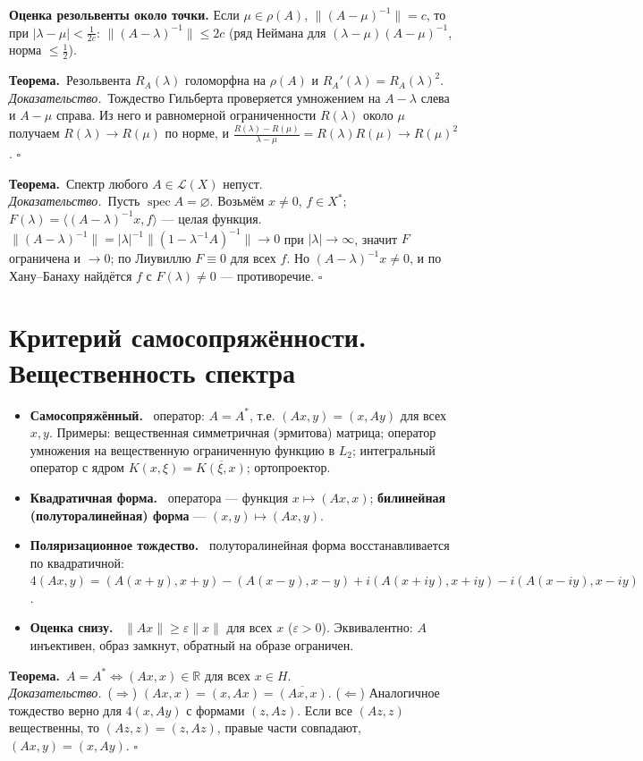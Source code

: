 \documentclass[11pt,a4paper]{article}
\newcommand{\Lc}{\mathcal L}
\newcommand{\RR}{\mathbb R}
\newcommand{\spec}{\operatorname{spec}}
\newcommand{\df}[1]{\textbf{#1.}~}
\newcommand{\thm}{\textbf{Теорема.}~}
\newcommand{\pf}{\textit{Доказательство.}~}
\newcommand{\qedd}{\hfill$\square$}
\begin{document}
\textbf{Оценка резольвенты около точки.} Если $\mu\in\rho(A)$, $\|(A-\mu)^{-1}\|=c$, то при $|\lambda-\mu|<\frac1{2c}$: $\|(A-\lambda)^{-1}\|\le2c$ (ряд Неймана для $(\lambda-\mu)(A-\mu)^{-1}$, норма $\le\frac12$).

\thm Резольвента $R_A(\lambda)$ голоморфна на $\rho(A)$ и $R_A'(\lambda)=R_A(\lambda)^2$.\\
\pf Тождество Гильберта проверяется умножением на $A-\lambda$ слева и $A-\mu$ справа. Из него и равномерной ограниченности $R(\lambda)$ около $\mu$ получаем $R(\lambda)\to R(\mu)$ по норме, и $\frac{R(\lambda)-R(\mu)}{\lambda-\mu}=R(\lambda)R(\mu)\to R(\mu)^2$. \qedd

\thm Спектр любого $A\in\Lc(X)$ непуст.\\
\pf Пусть $\spec A=\varnothing$. Возьмём $x\ne0$, $f\in X^*$; $F(\lambda)=\langle(A-\lambda)^{-1}x,f\rangle$ — целая функция. $\|(A-\lambda)^{-1}\|=|\lambda|^{-1}\|(1-\lambda^{-1}A)^{-1}\|\to0$ при $|\lambda|\to\infty$, значит $F$ ограничена и $\to0$; по Лиувиллю $F\equiv0$ для всех $f$. Но $(A-\lambda)^{-1}x\ne0$, и по Хану–Банаху найдётся $f$ с $F(\lambda)\ne0$ — противоречие. \qedd

\section{Критерий самосопряжённости. Вещественность спектра}
\begin{defs}
\begin{itemize}
\item \df{Самосопряжённый} оператор: $A=A^*$, т.е. $(Ax,y)=(x,Ay)$ для всех $x,y$. Примеры: вещественная симметричная (эрмитова) матрица; оператор умножения на вещественную ограниченную функцию в $L_2$; интегральный оператор с ядром $K(x,\xi)=\overline{K(\xi,x)}$; ортопроектор.
\item \df{Квадратичная форма} оператора — функция $x\mapsto(Ax,x)$; \textbf{билинейная (полуторалинейная) форма} — $(x,y)\mapsto(Ax,y)$.
\item \df{Поляризационное тождество} полуторалинейная форма восстанавливается по квадратичной:
$4(Ax,y)=(A(x+y),x+y)-(A(x-y),x-y)+i(A(x+iy),x+iy)-i(A(x-iy),x-iy)$.
\item \df{Оценка снизу} $\|Ax\|\ge\varepsilon\|x\|$ для всех $x$ ($\varepsilon>0$). Эквивалентно: $A$ инъективен, образ замкнут, обратный на образе ограничен.
\end{itemize}
\end{defs}

\thm $A=A^*\iff(Ax,x)\in\RR$ для всех $x\in H$.\\
\pf ($\Rightarrow$) $(Ax,x)=(x,Ax)=\overline{(Ax,x)}$. ($\Leftarrow$) Аналогичное тождество верно для $4(x,Ay)$ с формами $(z,Az)$. Если все $(Az,z)$ вещественны, то $(Az,z)=(z,Az)$, правые части совпадают, $(Ax,y)=(x,Ay)$. \qedd
\end{document}
